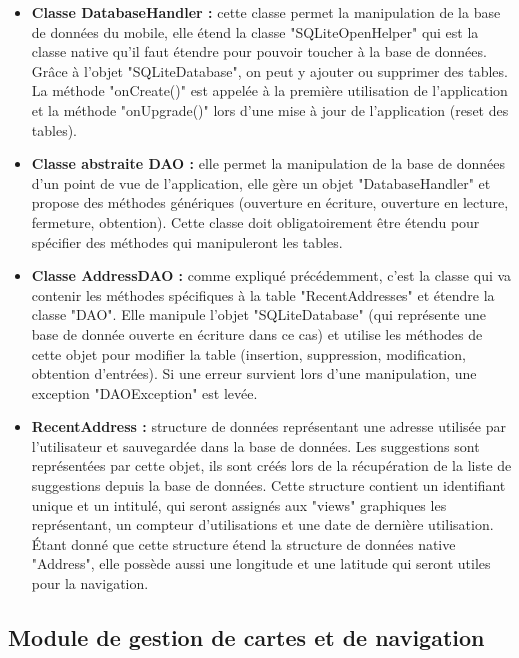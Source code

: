 \begin{itemize}
\item \textbf{Classe DatabaseHandler :} cette classe permet la manipulation de la base de données du mobile, elle étend la classe "SQLiteOpenHelper" qui est la classe native qu'il faut étendre pour pouvoir toucher à la base de données. Grâce à l'objet "SQLiteDatabase", on peut y ajouter ou supprimer des tables. La méthode "onCreate()" est appelée à la première utilisation de l'application et la méthode "onUpgrade()" lors d'une mise à jour de l'application (reset des tables).\\
\item \textbf{Classe abstraite DAO :} elle permet la manipulation de la base de données d'un point de vue de l'application, elle gère un objet "DatabaseHandler" et propose des méthodes génériques (ouverture en écriture, ouverture en lecture, fermeture, obtention). Cette classe doit obligatoirement être étendu pour spécifier des méthodes qui manipuleront les tables.\\
\item \textbf{Classe AddressDAO :} comme expliqué précédemment, c'est la classe qui va contenir les méthodes spécifiques à la table "RecentAddresses" et étendre la classe "DAO". Elle manipule l'objet "SQLiteDatabase" (qui représente une base de donnée ouverte en écriture dans ce cas) et utilise les méthodes de cette objet pour modifier la table (insertion, suppression, modification, obtention d'entrées). Si une erreur survient lors d'une manipulation, une exception "DAOException" est levée.\\
\item \textbf{RecentAddress :} structure de données représentant une adresse utilisée par l'utilisateur et sauvegardée dans la base de données. Les suggestions sont représentées par cette objet, ils sont créés lors de la récupération de la liste de suggestions depuis la base de données. Cette structure contient un identifiant unique et un intitulé, qui seront assignés aux "views" graphiques les représentant, un compteur d'utilisations et une date de dernière utilisation. Étant donné que cette structure étend la structure de données native "Address", elle possède aussi une longitude et une latitude qui seront utiles pour la navigation.
\end{itemize}

\newpage
\subsection{Module de gestion de cartes et de navigation}

